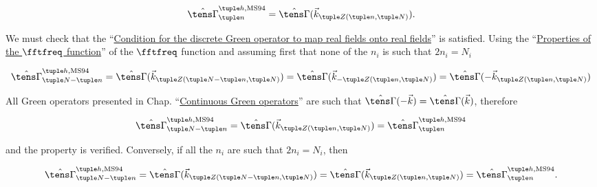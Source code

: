\documentclass[oneside]{memoir}
\begin{document}
\begin{equation*}
\begin{split}\hat{\tens\Gamma}_{\tuple n}^{\tuple h, \mathrm{MS94}}=\hat{\tens\Gamma}
(\vec k_{\tuple Z(\tuple n, \tuple N)}).\end{split}\end{equation*}


We must check that the “\hyperlink{4640340478983239538}{Condition for the discrete Green operator to map real fields onto real fields}” is satisfied. Using the “\hyperlink{15063944043531008847}{Properties of the \(\fftfreq\) function}” of the \(\fftfreq\) function and assuming first that none of the \(n_i\) is such that \(2n_i=N_i\)



\begin{equation*}
\begin{split}\hat{\tens\Gamma}_{\tuple N-\tuple n}^{\tuple h, \mathrm{MS94}}
=\hat{\tens\Gamma}(\vec k_{\tuple Z(\tuple N-\tuple n, \tuple N)})
=\hat{\tens\Gamma}(\vec k_{-\tuple Z(\tuple n, \tuple N)})
=\hat{\tens\Gamma}(-\vec k_{\tuple Z(\tuple n, \tuple N)})\end{split}\end{equation*}


All Green operators presented in Chap. “\hyperlink{11249657459891667799}{Continuous Green operators}” are such that \(\hat{\tens\Gamma}(-\vec k)=\hat{\tens\Gamma}(\vec k)\), therefore



\begin{equation*}
\begin{split}\hat{\tens\Gamma}_{\tuple N-\tuple n}^{\tuple h, \mathrm{MS94}}
=\hat{\tens\Gamma}(\vec k_{\tuple Z(\tuple n, \tuple N)})
=\hat{\tens\Gamma}_{\tuple n}^{\tuple h, \mathrm{MS94}}\end{split}\end{equation*}


and the property is verified. Conversely, if all the \(n_i\) are such that \(2n_i=N_i\), then



\begin{equation*}
\begin{split}\hat{\tens\Gamma}_{\tuple N-\tuple n}^{\tuple h, \mathrm{MS94}}
=\hat{\tens\Gamma}(\vec k_{\tuple Z(\tuple N-\tuple n, \tuple N)})
=\hat{\tens\Gamma}(\vec k_{\tuple Z(\tuple n, \tuple N)})
=\hat{\tens\Gamma}_{\tuple n}^{\tuple h, \mathrm{MS94}}.\end{split}\end{equation*}
\end{document}
